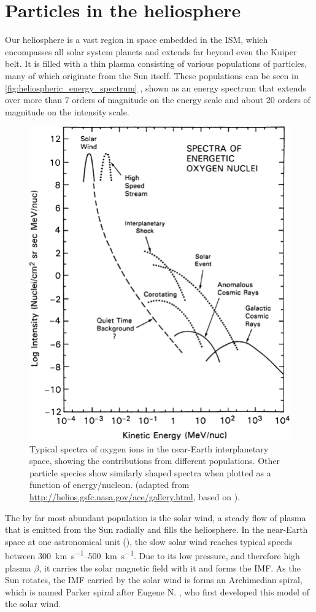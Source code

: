 \section{Particles in the heliosphere}
\label{sec:particles_heliosphere}

Our heliosphere is a vast region in space embedded in the \ac{ISM}, which encompasses all solar system planets and extends far beyond even the Kuiper belt. 
It is filled with a thin plasma consisting of various populations of particles, many of which originate from the Sun itself. These populations can be seen in \autoref{fig:heliospheric_energy_spectrum} \citep[based on measurements by][]{Mewaldt-2001}, shown as an energy spectrum that extends over more than 7 orders of magnitude on the energy scale and about 20 orders of magnitude on the intensity scale.
\begin{figure}
    \centering
    \includegraphics[width=0.6\linewidth]{images/heliospheric_energy_spectrum}
    \caption[Spectra of oxygen ions in the near-Earth interplanetary space]{Typical spectra of oxygen ions in the near-Earth interplanetary space, showing the contributions from different populations. Other particle species show similarly shaped spectra when plotted as a function of energy/nucleon. (adapted from \url{http://helios.gsfc.nasa.gov/ace/gallery.html}, based on \cite{Mewaldt-2001}).}
    \label{fig:heliospheric_energy_spectrum}
\end{figure}
The by far most abundant population is the solar wind, a steady flow of plasma that is emitted from the Sun radially and fills the heliosphere. 
In the near-Earth space at one astronomical unit (\si{\AU}), the slow solar wind reaches typical speeds between \SIrange[range-phrase={\,and\,}]{300}{500}{\kilo\meter\per\second}.
Due to its low pressure, and therefore high plasma $\beta$, it carries the solar magnetic field with it and forms the \ac{IMF}.
As the Sun rotates, the \ac{IMF} carried by the solar wind is forms an Archimedian spiral, which is named Parker spiral after Eugene N. \citet{Parker-1958}, who first developed this model of the solar wind.

